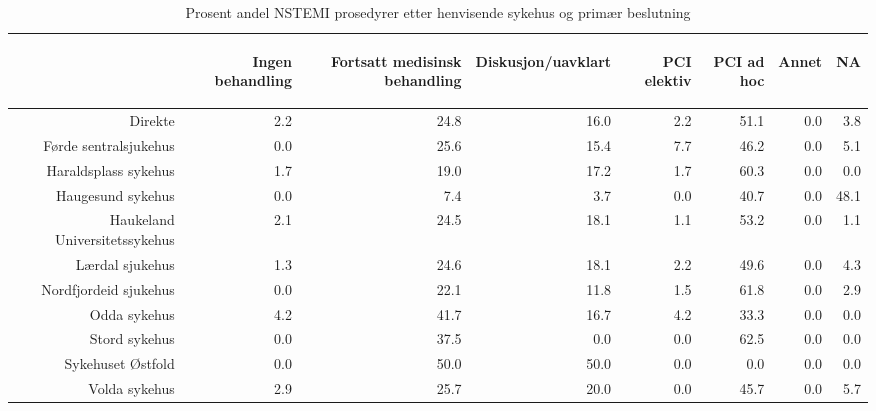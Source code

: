 \documentclass[presentation,xcolor=pdftex,dvipsnames,table]{beamer}
\begin{document}
\begin{frame}
\begin{tiny}
\begin{table}[ht]
\centering
\begin{tabular}{rrrrrrrr}
  \toprule
 & \begin{sideways} Ingen behandling \end{sideways} & \begin{sideways} Fortsatt medisinsk behandling \end{sideways} & \begin{sideways} Diskusjon/uavklart \end{sideways} & \begin{sideways} PCI elektiv \end{sideways} & \begin{sideways} PCI ad hoc \end{sideways} & \begin{sideways} Annet \end{sideways} & \begin{sideways} NA \end{sideways} \\ 
  \midrule
Direkte & 2.2 & 24.8 & 16.0 & 2.2 & 51.1 & 0.0 & 3.8 \\ 
  Førde sentralsjukehus & 0.0 & 25.6 & 15.4 & 7.7 & 46.2 & 0.0 & 5.1 \\ 
  Haraldsplass sykehus & 1.7 & 19.0 & 17.2 & 1.7 & 60.3 & 0.0 & 0.0 \\ 
  Haugesund sykehus & 0.0 & 7.4 & 3.7 & 0.0 & 40.7 & 0.0 & 48.1 \\ 
  Haukeland Universitetssykehus & 2.1 & 24.5 & 18.1 & 1.1 & 53.2 & 0.0 & 1.1 \\ 
  Lærdal sjukehus & 1.3 & 24.6 & 18.1 & 2.2 & 49.6 & 0.0 & 4.3 \\ 
  Nordfjordeid sjukehus & 0.0 & 22.1 & 11.8 & 1.5 & 61.8 & 0.0 & 2.9 \\ 
  Odda sykehus & 4.2 & 41.7 & 16.7 & 4.2 & 33.3 & 0.0 & 0.0 \\ 
  Stord sykehus & 0.0 & 37.5 & 0.0 & 0.0 & 62.5 & 0.0 & 0.0 \\ 
  Sykehuset Østfold & 0.0 & 50.0 & 50.0 & 0.0 & 0.0 & 0.0 & 0.0 \\ 
  Volda sykehus & 2.9 & 25.7 & 20.0 & 0.0 & 45.7 & 0.0 & 5.7 \\ 
   \bottomrule
\end{tabular}
\caption{Prosent andel NSTEMI prosedyrer etter henvisende sykehus og primær beslutning} 
\end{table}\end{tiny}
\end{frame}
\end{document}
